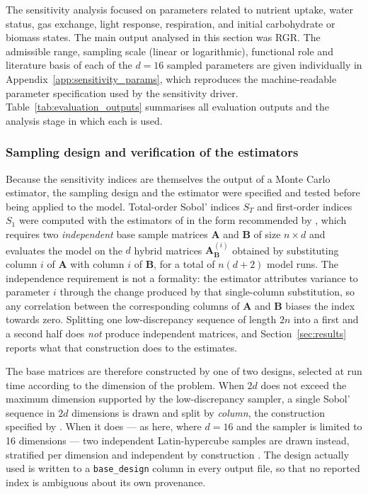 \documentclass[a4paper,fleqn]{cas-sc}
\begin{document}
The sensitivity analysis focused on parameters related to nutrient uptake,
water status, gas exchange, light response, respiration, and initial
carbohydrate or biomass states. The main output analysed in this section was
RGR. The admissible range, sampling scale (linear or logarithmic), functional
role and literature basis of each of the $d=16$ sampled parameters are given
individually in Appendix~\ref{app:sensitivity_params}, which reproduces the
machine-readable parameter specification used by the sensitivity driver.
Table~\ref{tab:evaluation_outputs} summarises all evaluation outputs and
the analysis stage in which each is used.

\subsubsection{Sampling design and verification of the estimators}
\label{sec:sa_design}

Because the sensitivity indices are themselves the output of a Monte Carlo
estimator, the sampling design and the estimator were specified and tested
before being applied to the model. Total-order Sobol' indices $S_T$ and
first-order indices $S_1$ were computed with the estimators of
\citet{Sobol2001} in the form recommended by \citet{Saltelli2010}, which
requires two \emph{independent} base sample matrices $\mathbf{A}$ and
$\mathbf{B}$ of size $n \times d$ and evaluates the model on the $d$ hybrid
matrices $\mathbf{A}_{\mathbf{B}}^{(i)}$ obtained by substituting column $i$
of $\mathbf{A}$ with column $i$ of $\mathbf{B}$, for a total of $n(d+2)$
model runs. The independence requirement is not a formality: the estimator
attributes variance to parameter $i$ through the change produced by that
single-column substitution, so any correlation between the corresponding
columns of $\mathbf{A}$ and $\mathbf{B}$ biases the index towards zero.
Splitting one low-discrepancy sequence of length $2n$ into a first and a
second half does \emph{not} produce independent matrices, and
Section~\ref{sec:results} reports what that construction does to the
estimates.

The base matrices are therefore constructed by one of two designs, selected
at run time according to the dimension of the problem. When $2d$ does not
exceed the maximum dimension supported by the low-discrepancy sampler, a
single Sobol' sequence in $2d$ dimensions is drawn and split by
\emph{column}, the construction specified by \citet{Saltelli2010}. When it
does --- as here, where $d=16$ and the sampler is limited to 16 dimensions
--- two independent Latin-hypercube samples are drawn instead, stratified
per dimension and independent by construction \citep{McKay1979}. The design
actually used is written to a \texttt{base\_design} column in every output
file, so that no reported index is ambiguous about its own provenance.
\end{document}
